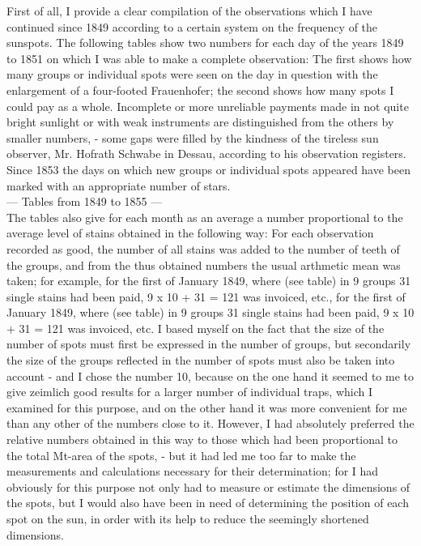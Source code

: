 \documentclass[12pt]{article}
\begin{document}
First of all, I provide a clear compilation of the observations which I have continued since 1849 according to a certain system on the frequency of the sunspots. The following tables show two numbers for each day of the years 1849 to 1851 on which I was able to make a complete observation: The first shows how many groups or individual spots were seen on the day in question with the enlargement of a four-footed Frauenhofer; the second shows how many spots I could pay as a whole. Incomplete or more unreliable payments made in not quite bright sunlight or with weak instruments are distinguished from the others by smaller numbers, - some gaps were filled by the kindness of the tireless sun observer, Mr. Hofrath Schwabe in Dessau, according to his observation registers. Since 1853 the days on which new groups or individual spots appeared have been marked with an appropriate number of stars.\\

--- Tables from 1849 to 1855 ---\\

The tables also give for each month as an average a number proportional to the average level of stains obtained in the following way: For each observation recorded as good, the number of all stains was added to the number of teeth of the groups, and from the thus obtained numbers the usual arthmetic mean was taken; for example, for the first of January 1849, where (see table) in 9 groups 31 single stains had been paid, 9 x 10 + 31 = 121 was invoiced, etc., for the first of January 1849, where (see table) in 9 groups 31 single stains had been paid, 9 x 10 + 31 = 121 was invoiced, etc. I based myself on the fact that the size of the number of spots must first be expressed in the number of groups, but secondarily the size of the groups reflected in the number of spots must also be taken into account - and I chose the number 10, because on the one hand it seemed to me to give zeimlich good results for a larger number of individual traps, which I examined for this purpose, and on the other hand it was more convenient for me than any other of the numbers close to it. However, I had absolutely preferred the relative numbers obtained in this way to those which had been proportional to the total Mt-area of the spots, - but it had led me too far to make the measurements and calculations necessary for their determination; for I had obviously for this purpose not only had to measure or estimate the dimensions of the spots, but I would also have been in need of determining the position of each spot on the sun, in order with its help to reduce the seemingly shortened dimensions.\\
\end{document}
